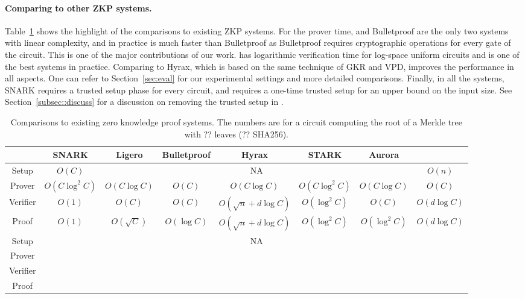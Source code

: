 \paragraph{Comparing to other ZKP systems.} Table~\ref{tab:zkpall} shows the highlight of the comparisons to existing ZKP systems. For the prover time, \name and Bulletproof are the only two systems with linear complexity, and in practice \name is much faster than Bulletproof as Bulletproof requires cryptographic operations for every gate of the circuit. This is one of the major contributions of our work. \name has logarithmic verification time for log-space uniform circuits and is one of the best systems in practice. Comparing to Hyrax, which is based on the same technique of GKR and VPD, \name improves the performance in all aspects. One can refer to Section~\ref{sec:eval} for our experimental settings and more detailed comparisons. Finally, in all the systems, SNARK requires a trusted setup phase for every circuit, and \name requires a one-time trusted setup for an upper bound on the input size. See Section~\ref{subsec::discuss} for a discussion on removing the trusted setup in \name. 



\begin{table}[h]
	\centering
	{\footnotesize
	\begin{tabular}{|c|c|c|c|c|c|c|c|}
		
		\hline
		&SNARK&Ligero&Bulletproof&Hyrax&STARK&Aurora&\name\\
		\hline
		\hline
		Setup&$O(C)$&\multicolumn{5}{c|}{NA}&$O(n)$\\
		\hline
		Prover&$O(C\log^2C)$&$O(C\log C)$&$O(C)$&$O(C\log C)$&$O(C\log^2 C)$&$O(C\log C)$ &$O(C)$\\
		\hline
		Verifier&$O(1)$&$O(C)$&$O(C)$&$O(\sqrt{n}+d\log C)$&$O(\log^2 C)$&$O(C)$&$O(d\log C)$\\
		\hline
		Proof&$O(1)$&$O(\sqrt{C})$&$O(\log C)$&$O(\sqrt{n}+d\log C)$&$O(\log^2 C)$& $O(\log^2 C)$&$O(d\log C)$\\
		\hline
		\hline
		Setup&&\multicolumn{5}{c|}{NA}&\\
		\hline
		Prover&&&&&&&\\
		\hline
		Verifier&&&&&&&\\
		\hline
		Proof&&&&&&&\\
		\hline
	\end{tabular}
}
\caption{Comparisons to existing zero knowledge proof systems. The numbers are for a circuit computing the root of a Merkle tree with ?? leaves (?? SHA256).\protect\footnotemark}\label{tab:zkpall}
\end{table}

